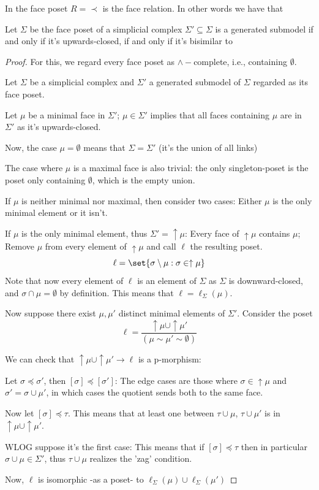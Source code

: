 In the face poset $R=\prec$ is the face relation. In other words we have that
\begin{proposition}\hfill 

Let $\Sigma$ be the face poset of a simplicial complex 
$\Sigma'\subseteq \Sigma$ is a generated submodel if and only if it's upwards-closed, if and only if it's bisimilar to 
\end{proposition}
\begin{proof}
For this, we regard every face poset as $\wedge-$complete, i.e., containing $\emptyset$.

Let $\Sigma$ be a simplicial complex and $\Sigma'$ a generated submodel of $\Sigma$ regarded as its face poset. 

Let $\mu$ be a minimal face in $\Sigma'$; $\mu\in \Sigma'$ implies that all faces containing $\mu$ are in $\Sigma'$ as it's upwards-closed.

Now, the case $\mu=\emptyset$ means that $\Sigma=\Sigma'$ (it's the union of all links)

The case where $\mu$ is a maximal face is also trivial: the only singleton-poset is the poset only containing $\emptyset$, which is the empty union.

If $\mu$ is neither minimal nor maximal, then consider two cases: Either $\mu$ is the only minimal element or it isn't.

If $\mu$ is the only minimal element, thus $\Sigma'=\uparrow\mu$: Every face of $\uparrow\mu$ contains $\mu$; Remove $\mu$ from every element of $\uparrow\mu$
and call $\ell$ the resulting poset. 
\[\ell=\set{\sigma\setminus\mu:\sigma\in\uparrow\mu}\]
Note that now every element of $\ell$ is an element of $\Sigma$ as $\Sigma$ is downward-closed, and $\sigma\cap \mu=\emptyset$ by definition. 
This means that $\ell=\ell_{\Sigma}(\mu)$.

Now suppose there exist $\mu,\mu'$ distinct minimal elements of $\Sigma'$.
Consider the poset \[\ell=\dfrac{\uparrow\mu\cup\uparrow\mu'}{(\mu\sim\mu'\sim \emptyset)}\]

We can check that $\uparrow\mu\cup\uparrow\mu'\to \ell$ is a p-morphism:

Let $\sigma\preceq\sigma'$, then $[\sigma]\preceq[\sigma']$: The edge cases are those where $\sigma\in \uparrow\mu$ and $\sigma'=\sigma\cup\mu'$, in which cases the
quotient sends both to the same face.

Now let $[\sigma]\preceq \tau$. This means that at least one between $\tau\cup\mu$, $\tau\cup\mu'$ is in $\uparrow\mu\cup\uparrow\mu'$.

    WLOG suppose it's the first case: This means that if $[\sigma]\preceq\tau$ then in particular $\sigma\cup\mu\in \Sigma'$, thus $\tau\cup\mu$ realizes the 'zag' condition.

Now, $\ell$ is isomorphic -as a poset- to $\ell_\Sigma(\mu)\cup\ell_\Sigma(\mu')$ 
\end{proof}